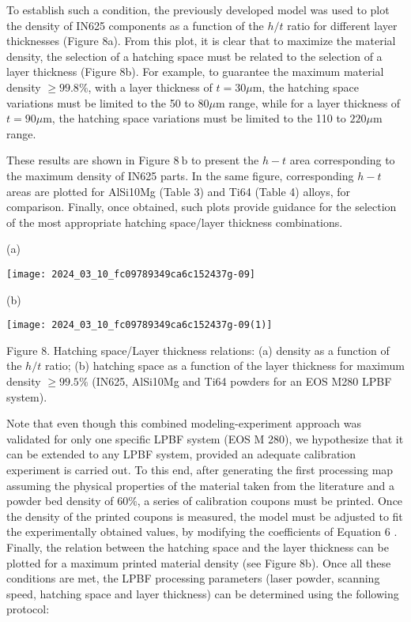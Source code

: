 \documentclass[10pt]{article}
\begin{document}
To establish such a condition, the previously developed model was used to plot the density of IN625 components as a function of the $h / t$ ratio for different layer thicknesses (Figure 8a). From this plot, it is clear that to maximize the material density, the selection of a hatching space must be related to the selection of a layer thickness (Figure 8b). For example, to guarantee the maximum material density $\geq 99.8 \%$, with a layer thickness of $t=30 \mu \mathrm{m}$, the hatching space variations must be limited to the 50 to $80 \mu \mathrm{m}$ range, while for a layer thickness of $t=90 \mu \mathrm{m}$, the hatching space variations must be limited to the 110 to $220 \mu \mathrm{m}$ range.

These results are shown in Figure $8 \mathrm{~b}$ to present the $h-t$ area corresponding to the maximum density of IN625 parts. In the same figure, corresponding $h-t$ areas are plotted for AlSi10Mg (Table 3) and Ti64 (Table 4) alloys, for comparison. Finally, once obtained, such plots provide guidance for the selection of the most appropriate hatching space/layer thickness combinations.

(a)

\begin{center}
\texttt{[image: 2024\_03\_10\_fc09789349ca6c152437g-09]}
\end{center}

(b)

\begin{center}
\texttt{[image: 2024\_03\_10\_fc09789349ca6c152437g-09(1)]}
\end{center}

Figure 8. Hatching space/Layer thickness relations: (a) density as a function of the $h / t$ ratio; (b) hatching space as a function of the layer thickness for maximum density $\geq 99.5 \%$ (IN625, AlSi10Mg and Ti64 powders for an EOS M280 LPBF system).

Note that even though this combined modeling-experiment approach was validated for only one specific LPBF system (EOS M 280), we hypothesize that it can be extended to any LPBF system, provided an adequate calibration experiment is carried out. To this end, after generating the first processing map assuming the physical properties of the material taken from the literature and a powder bed density of $60 \%$, a series of calibration coupons must be printed. Once the density of the printed coupons is measured, the model must be adjusted to fit the experimentally obtained values, by modifying the coefficients of Equation 6 . Finally, the relation between the hatching space and the layer thickness can be plotted for a maximum printed material density (see Figure 8b). Once all these conditions are met, the LPBF processing parameters (laser powder, scanning speed, hatching space and layer thickness) can be determined using the following protocol:
\end{document}
